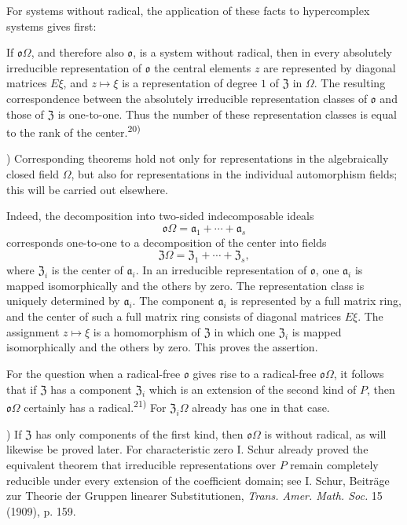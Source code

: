 \documentclass[11pt]{article}
\providecommand{\mo}{\mathfrak{o}}
\providecommand{\ma}{\mathfrak{a}}
\providecommand{\mZ}{\mathfrak{Z}}
\begin{document}
For systems without radical, the application of these facts to hypercomplex systems gives first:

If $\mo\Omega$, and therefore also $\mo$, is a system without radical, then in every absolutely irreducible representation of $\mo$ the central elements $z$ are represented by diagonal matrices $E\xi$, and $z\mapsto \xi$ is a representation of degree $1$ of $\mZ$ in $\Omega$. The resulting correspondence between the absolutely irreducible representation classes of $\mo$ and those of $\mZ$ is one-to-one. Thus the number of these representation classes is equal to the rank of the center.\textsuperscript{20)}

{\footnotesize{}) Corresponding theorems hold not only for representations in the algebraically closed field $\Omega$, but also for representations in the individual automorphism fields; this will be carried out elsewhere.\par}

Indeed, the decomposition into two-sided indecomposable ideals
\[
        \mo\Omega=\ma_1+\cdots+\ma_s
\]
corresponds one-to-one to a decomposition of the center into fields
\[
        \mZ\Omega=\mZ_1+\cdots+\mZ_s,
\]
where $\mZ_i$ is the center of $\ma_i$. In an irreducible representation of $\mo$, one $\ma_i$ is mapped isomorphically and the others by zero. The representation class is uniquely determined by $\ma_i$. The component $\ma_i$ is represented by a full matrix ring, and the center of such a full matrix ring consists of diagonal matrices $E\xi$. The assignment $z\mapsto \xi$ is a homomorphism of $\mZ$ in which one $\mZ_i$ is mapped isomorphically and the others by zero. This proves the assertion.

For the question when a radical-free $\mo$ gives rise to a radical-free $\mo\Omega$, it follows that if $\mZ$ has a component $\mZ_i$ which is an extension of the second kind of $P$, then $\mo\Omega$ certainly has a radical.\textsuperscript{21)} For $\mZ_i\Omega$ already has one in that case.

{\footnotesize{}) If $\mZ$ has only components of the first kind, then $\mo\Omega$ is without radical, as will likewise be proved later. For characteristic zero I. Schur already proved the equivalent theorem that irreducible representations over $P$ remain completely reducible under every extension of the coefficient domain; see I. Schur, Beiträge zur Theorie der Gruppen linearer Substitutionen, \emph{Trans. Amer. Math. Soc.} 15 (1909), p. 159.\par}
\end{document}
